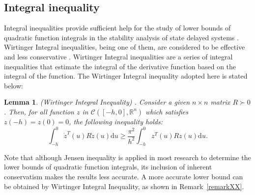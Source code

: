 \documentclass[a4paper]{cas-sc}
\newtheorem{lemma}[theorem]{Lemma}
\begin{document}
\subsection{Integral inequality}
\label{Section 2.2}

Integral inequalities provide sufficient help for the study of lower bounds of quadratic function integrals in the stability analysis of state delayed systems \citep{martyniuk_integral_1979,zhang_stability_2016,li_uniform_2021}. Wirtinger Integral inequalities, being one of them, are considered to be effective and less conservative \citep{saravanan_finite-time_2021,suresh_robust_2021}. Wirtinger Integral inequalities are a series of integral inequalities that estimate the integral of the derivative function based on the integral of the function. The Wirtinger Integral inequality adopted here is stated below:
\begin{lemma}
  \label{lemma1}
  (Wirtinger Integral Inequality) \citep{park_stability_2015}. Consider a given $ n \times n $ matrix $ R \succ 0 $. Then, for all function $z$ in $ \mathcal{C}\left( {\left[ { - h,0} \right],{\mathbb{R}^n}} \right) $ which satisfies $ z( - h) = z(0) = 0 $, the following inequality holds:
  \begin{equation}
    \int_{ - h}^0 {{{\dot z}^T}} (u)R\dot z(u){\text{d}}u \geqslant \frac{{{\pi ^2}}}{{{h^2}}}\int_{ - h}^0 {{z^T}} (u)Rz(u){\text{d}}u.
    \label{eqlemma1}
  \end{equation}
\end{lemma}

Note that although Jensen inequality \citep{Gu2003} is applied in most research to determine the lower bounds of quadratic function integrals, its inclusion of inherent conservatism makes the results less accurate. A more accurate lower bound can be obtained by Wirtinger Integral Inequality, as shown in Remark~\ref{remarkXX}.
\end{document}
